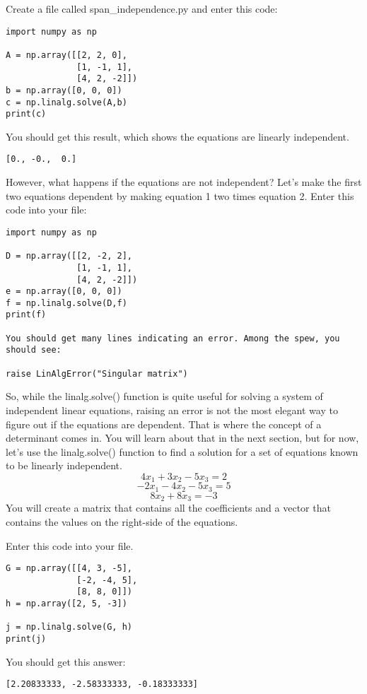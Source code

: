 Create a file called span\_independence.py and enter this code:
\begin{Verbatim}
import numpy as np

A = np.array([[2, 2, 0], 
              [1, -1, 1],
              [4, 2, -2]])
b = np.array([0, 0, 0])
c = np.linalg.solve(A,b)
print(c)
\end{Verbatim}
You should get this result, which shows the equations are linearly independent.
\begin{Verbatim}
[0., -0.,  0.]
\end{Verbatim}
However, what happens if the equations are not independent? Let's make the 
first two equations dependent by making equation 1 two times equation 2. Enter 
this code into your file:
\begin{Verbatim}
import numpy as np

D = np.array([[2, -2, 2], 
              [1, -1, 1],
              [4, 2, -2]])
e = np.array([0, 0, 0])
f = np.linalg.solve(D,f)
print(f)

You should get many lines indicating an error. Among the spew, you should see:

raise LinAlgError("Singular matrix")
\end{Verbatim}
So, while the linalg.solve() function is quite useful for solving a system of 
independent linear equations, raising an error is not the most elegant way to 
figure out if the equations are dependent. That is where the concept of a 
determinant comes in. You will learn about that in the next section, but for 
now, let's use the  linalg.solve() function to find a solution for a set of 
equations known to be linearly independent.
$$4x_1 + 3x_2 - 5x_3 = 2$$
$$-2x_1- 4x_2 - 5x_3 = 5$$
$$       8x_2 + 8x_3  = -3$$
You will create a matrix that contains all the coefficients and a vector that 
contains the values on the right-side of the equations. 

Enter this code into your file. 
\begin{Verbatim}
G = np.array([[4, 3, -5], 
              [-2, -4, 5], 
              [8, 8, 0]])
h = np.array([2, 5, -3])

j = np.linalg.solve(G, h)
print(j)
\end{Verbatim}
You should get this answer:
\begin{Verbatim}
[2.20833333, -2.58333333, -0.18333333]
\end{Verbatim}

